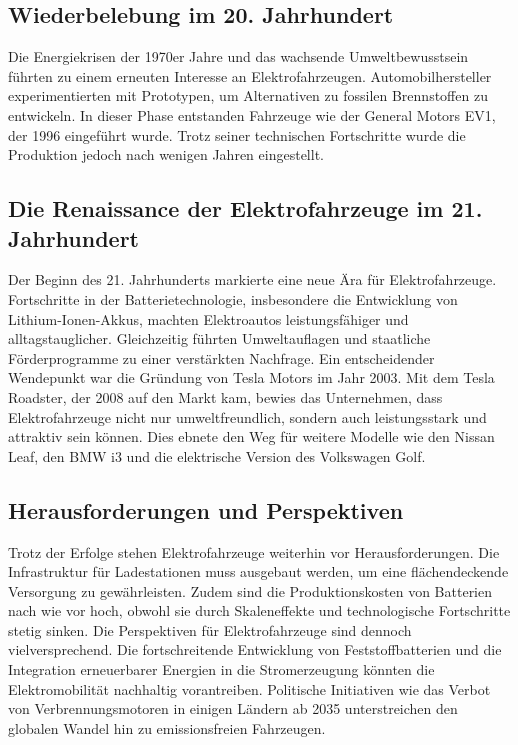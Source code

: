 \subsection*{Wiederbelebung im 20. Jahrhundert}

Die Energiekrisen der 1970er Jahre und das wachsende Umweltbewusstsein führten zu einem erneuten Interesse an Elektrofahrzeugen. \autocite{daswissen_oelkrise_1970er} Automobilhersteller experimentierten mit Prototypen, um Alternativen zu fossilen Brennstoffen zu entwickeln. \autocite{energieleben_ev1_geschichte} In dieser Phase entstanden Fahrzeuge wie der General Motors EV1, der 1996 eingeführt wurde. \autocite{insideevs_gm_ev1}
Trotz seiner technischen Fortschritte wurde die Produktion jedoch nach wenigen Jahren eingestellt.\autocite{energieleben_ev1_geschichte} 

\subsection*{Die Renaissance der Elektrofahrzeuge im 21. Jahrhundert}
Der Beginn des 21. Jahrhunderts markierte eine neue Ära für Elektrofahrzeuge. Fortschritte in der Batterietechnologie, insbesondere die Entwicklung von Lithium-Ionen-Akkus, machten Elektroautos leistungsfähiger und alltagstauglicher. \autocite{sonepar_batterien_2023} Gleichzeitig führten Umweltauflagen und staatliche Förderprogramme zu einer verstärkten Nachfrage.\newline
Ein entscheidender Wendepunkt war die Gründung von Tesla Motors im Jahr 2003. Mit dem Tesla Roadster, der 2008 auf den Markt kam, bewies das Unternehmen, dass Elektrofahrzeuge nicht nur umweltfreundlich, sondern auch leistungsstark und attraktiv sein können. Dies ebnete den Weg für weitere Modelle wie den Nissan Leaf, den BMW i3 und die elektrische Version des Volkswagen Golf. \autocite{insidetesla_tesla_geschichte}

\subsection*{Herausforderungen und Perspektiven}
Trotz der Erfolge stehen Elektrofahrzeuge weiterhin vor Herausforderungen.  Die Infrastruktur für Ladestationen muss ausgebaut werden, um eine flächendeckende Versorgung zu gewährleisten. \autocite{statista_ladeinfrastruktur_elektroautos} Zudem sind die Produktionskosten von Batterien nach wie vor hoch, obwohl sie durch Skaleneffekte und technologische Fortschritte stetig sinken. \autocite{automobilproduktion_produktionskosten_elektroautos} \newline
Die Perspektiven für Elektrofahrzeuge sind dennoch vielversprechend. Die fortschreitende Entwicklung von Feststoffbatterien und die Integration erneuerbarer Energien in die Stromerzeugung könnten die Elektromobilität nachhaltig vorantreiben. Politische Initiativen wie das Verbot von Verbrennungsmotoren in einigen Ländern ab 2035 unterstreichen den globalen Wandel hin zu emissionsfreien Fahrzeugen. \autocite{fraunhofer_batterie_rohstoffe}

